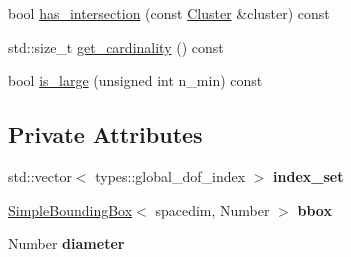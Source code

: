 \begin{DoxyCompactItemize}
\item 
bool \hyperlink{classCluster_ad70ce1f046bb3b47fff585eaf6ec4856}{has\+\_\+intersection} (const \hyperlink{classCluster}{Cluster} \&cluster) const
\item 
std\+::size\+\_\+t \hyperlink{classCluster_a7fd600d238aa703f40407e609c08fec6}{get\+\_\+cardinality} () const
\item 
bool \hyperlink{classCluster_a55c608dd38d185c394e516d106fea02a}{is\+\_\+large} (unsigned int n\+\_\+min) const
\end{DoxyCompactItemize}

\subsection*{Private Attributes}
\begin{DoxyCompactItemize}
\item 
\mbox{\label{classCluster_a93791a440f03b43cdfa89e48be33cddb}} 
std\+::vector$<$ types\+::global\+\_\+dof\+\_\+index $>$ {\bfseries index\+\_\+set}
\item 
\mbox{\label{classCluster_ac0332366e2e144f5a97cb19a8bbdec71}} 
\hyperlink{classSimpleBoundingBox}{Simple\+Bounding\+Box}$<$ spacedim, Number $>$ {\bfseries bbox}
\item 
\mbox{\label{classCluster_aa3689e19cea2145941c6ba116fbb295c}} 
Number {\bfseries diameter}
\end{DoxyCompactItemize}
